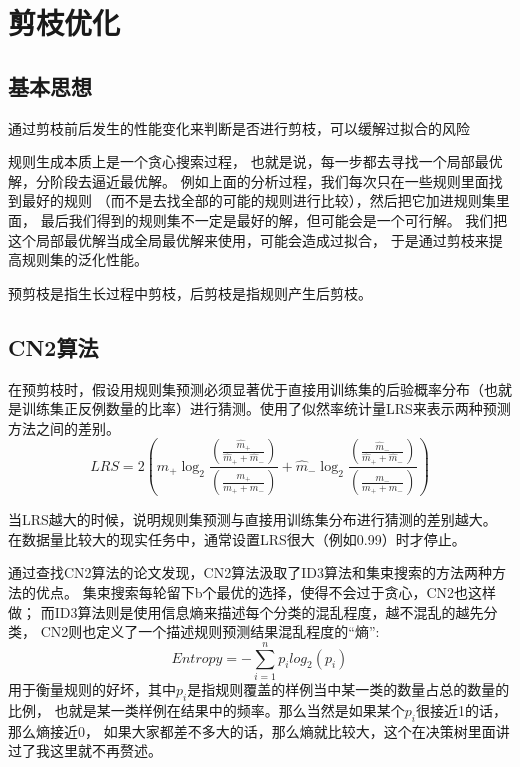 \documentclass[UTF8]{article}
\begin{document}
\section{剪枝优化}
\subsection{基本思想}
    通过剪枝前后发生的性能变化来判断是否进行剪枝，可以缓解过拟合的风险
    
    规则生成本质上是一个贪心搜索过程，
    也就是说，每一步都去寻找一个局部最优解，分阶段去逼近最优解。
    例如上面的分析过程，我们每次只在一些规则里面找到最好的规则
    （而不是去找全部的可能的规则进行比较），然后把它加进规则集里面，
    最后我们得到的规则集不一定是最好的解，但可能会是一个可行解。
    我们把这个局部最优解当成全局最优解来使用，可能会造成过拟合，
    于是通过剪枝来提高规则集的泛化性能。

    预剪枝是指生长过程中剪枝，后剪枝是指规则产生后剪枝。
\subsection{CN2算法}
    在预剪枝时，假设用规则集预测必须显著优于直接用训练集的后验概率分布（也就是训练集正反例数量的比率）进行猜测。使用了似然率统计量LRS来表示两种预测方法之间的差别。
    \begin{equation}\label{LRS}
        LRS = 2(\hat{m}_+ \log_2{\frac{(\frac{\hat{m}_+}{\hat{m}_+ + \hat{m}_-})}{(\frac{m_+}{m_+ + m_-})}} + 
        \hat{m}_- \log_2{\frac{(\frac{\hat{m}_-}{\hat{m}_+ + \hat{m}_-})}{(\frac{m_-}{m_+ + m_-})}})
    \end{equation}

    当LRS越大的时候，说明规则集预测与直接用训练集分布进行猜测的差别越大。
    在数据量比较大的现实任务中，通常设置LRS很大（例如0.99）时才停止。
    
    通过查找CN2算法的论文发现，CN2算法汲取了ID3算法和集束搜索的方法两种方法的优点。
    集束搜索每轮留下b个最优的选择，使得不会过于贪心，CN2也这样做；
    而ID3算法则是使用信息熵来描述每个分类的混乱程度，越不混乱的越先分类，
    CN2则也定义了一个描述规则预测结果混乱程度的“熵”:
    \begin{equation}
        Entropy = -\sum_{i=1}^n p_i log_2(p_i)
    \end{equation}
    用于衡量规则的好坏，其中$p_i$是指规则覆盖的样例当中某一类的数量占总的数量的比例，
    也就是某一类样例在结果中的频率。那么当然是如果某个$p_i$很接近1的话，那么熵接近0，
    如果大家都差不多大的话，那么熵就比较大，这个在决策树里面讲过了我这里就不再赘述。
    
\end{document}
